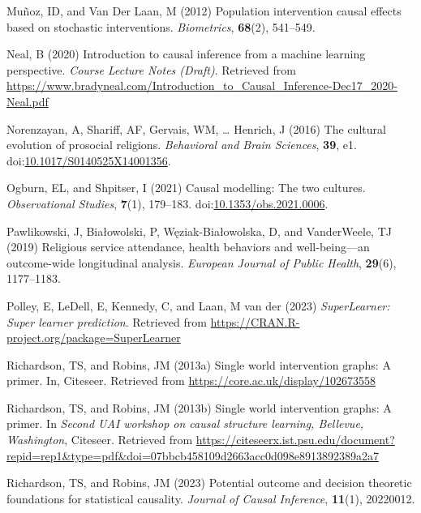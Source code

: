 \documentclass[
  single column]{article}
\newlength{\cslhangindent}
\newenvironment{CSLReferences}[2] %
 {\begin{list}{}{%
  \setlength{\itemindent}{0pt}
  \setlength{\leftmargin}{0pt}
  \setlength{\parsep}{0pt}
  \ifodd #1
   \setlength{\leftmargin}{\cslhangindent}
   \setlength{\itemindent}{-1\cslhangindent}
  \fi
  \setlength{\itemsep}{#2\baselineskip}}}
 {\end{list}}
\begin{document}
\begin{CSLReferences}{1}{0}
Muñoz, ID, and Van Der Laan, M (2012) Population intervention causal
effects based on stochastic interventions. \emph{Biometrics},
\textbf{68}(2), 541--549.

Neal, B (2020) Introduction to causal inference from a machine learning
perspective. \emph{Course Lecture Notes (Draft)}. Retrieved from
\url{https://www.bradyneal.com/Introduction_to_Causal_Inference-Dec17_2020-Neal.pdf}

Norenzayan, A, Shariff, AF, Gervais, WM, \ldots{} Henrich, J (2016) The
cultural evolution of prosocial religions. \emph{Behavioral and Brain
Sciences}, \textbf{39}, e1.
doi:\href{https://doi.org/10.1017/S0140525X14001356}{10.1017/S0140525X14001356}.

Ogburn, EL, and Shpitser, I (2021) Causal modelling: The two cultures.
\emph{Observational Studies}, \textbf{7}(1), 179--183.
doi:\href{https://doi.org/10.1353/obs.2021.0006}{10.1353/obs.2021.0006}.

Pawlikowski, J, Białowolski, P, Węziak-Białowolska, D, and VanderWeele,
TJ (2019) Religious service attendance, health behaviors and
well-being---an outcome-wide longitudinal analysis. \emph{European
Journal of Public Health}, \textbf{29}(6), 1177--1183.

Polley, E, LeDell, E, Kennedy, C, and Laan, M van der (2023)
\emph{SuperLearner: Super learner prediction}. Retrieved from
\url{https://CRAN.R-project.org/package=SuperLearner}

Richardson, TS, and Robins, JM (2013a) Single world intervention graphs:
A primer. In, Citeseer. Retrieved from
\url{https://core.ac.uk/display/102673558}

Richardson, TS, and Robins, JM (2013b) Single world intervention graphs:
A primer. In \emph{Second UAI workshop on causal structure learning,
{B}ellevue, {W}ashington}, Citeseer. Retrieved from
\url{https://citeseerx.ist.psu.edu/document?repid=rep1&type=pdf&doi=07bbcb458109d2663acc0d098e8913892389a2a7}

Richardson, TS, and Robins, JM (2023) Potential outcome and decision
theoretic foundations for statistical causality. \emph{Journal of Causal
Inference}, \textbf{11}(1), 20220012.


\end{CSLReferences}
\end{document}
